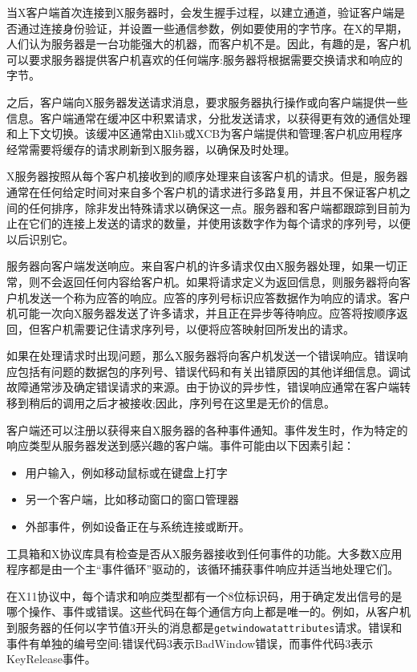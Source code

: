 当X客户端首次连接到X服务器时，会发生握手过程，以建立通道，验证客户端是否通过连接身份验证，并设置一些通信参数，例如要使用的字节序。在X的早期，人们认为服务器是一台功能强大的机器，而客户机不是。因此，有趣的是，客户机可以要求服务器提供客户机喜欢的任何端序:服务器将根据需要交换请求和响应的字节。

之后，客户端向X服务器发送请求消息，要求服务器执行操作或向客户端提供一些信息。客户端通常在缓冲区中积累请求，分批发送请求，以获得更有效的通信处理和上下文切换。该缓冲区通常由Xlib或XCB为客户端提供和管理;客户机应用程序经常需要将缓存的请求刷新到X服务器，以确保及时处理。

X服务器按照从每个客户机接收到的顺序处理来自该客户机的请求。但是，服务器通常在任何给定时间对来自多个客户机的请求进行多路复用，并且不保证客户机之间的任何排序，除非发出特殊请求以确保这一点。服务器和客户端都跟踪到目前为止在它们的连接上发送的请求的数量，并使用该数字作为每个请求的序列号，以便以后识别它。

服务器向客户端发送响应。来自客户机的许多请求仅由X服务器处理，如果一切正常，则不会返回任何内容给客户机。如果将请求定义为返回信息，则服务器将向客户机发送一个称为应答的响应。应答的序列号标识应答数据作为响应的请求。客户机可能一次向X服务器发送了许多请求，并且正在异步等待响应。应答将按顺序返回，但客户机需要记住请求序列号，以便将应答映射回所发出的请求。

如果在处理请求时出现问题，那么X服务器将向客户机发送一个错误响应。错误响应包括有问题的数据包的序列号、错误代码和有关出错原因的其他详细信息。调试故障通常涉及确定错误请求的来源。由于协议的异步性，错误响应通常在客户端转移到稍后的调用之后才被接收;因此，序列号在这里是无价的信息。

客户端还可以注册以获得来自X服务器的各种事件通知。事件发生时，作为特定的响应类型从服务器发送到感兴趣的客户端。事件可能由以下因素引起：

\vspace{-5mm}

\begin{itemize}
	\item 用户输入，例如移动鼠标或在键盘上打字
	\item 另一个客户端，比如移动窗口的窗口管理器
	\item 外部事件，例如设备正在与系统连接或断开。
\end{itemize}

工具箱和X协议库具有检查是否从X服务器接收到任何事件的功能。大多数X应用程序都是由一个主“事件循环”驱动的，该循环捕获事件响应并适当地处理它们。

在X11协议中，每个请求和响应类型都有一个8位标识码，用于确定发出信号的是哪个操作、事件或错误。这些代码在每个通信方向上都是唯一的。例如，从客户机到服务器的任何以字节值3开头的消息都是\lstinline|getwindowatattributes|请求。错误和事件有单独的编号空间:错误代码3表示BadWindow错误，而事件代码3表示KeyRelease事件。

